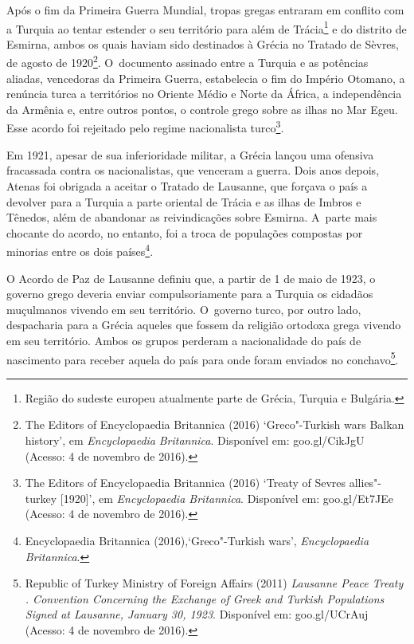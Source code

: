 Após o fim da Primeira Guerra Mundial, tropas gregas entraram em
conflito com a Turquia ao tentar estender o seu território para além
de Trácia\footnote{ Região do sudeste europeu atualmente parte de
Grécia, Turquia e Bulgária.}  e do distrito de Esmirna, ambos os quais
haviam sido destinados à Grécia no Tratado de Sèvres, de agosto de
1920\footnote{ The Editors of Encyclopaedia Britannica (2016)
`Greco"-Turkish wars \textbar{} Balkan history', em \emph{Encyclopaedia}
\emph{Britannica}. Disponível em:
goo.gl/CikJgU
(Acesso: 4 de
novembro de 2016).}. O~documento assinado entre a Turquia e as potências
aliadas, vencedoras da Primeira Guerra, estabelecia o fim do
Império Otomano, a renúncia turca a territórios no Oriente Médio e Norte
da África, a independência da Armênia e, entre outros pontos, o controle
grego sobre as ilhas no Mar Egeu. Esse acordo foi rejeitado pelo regime
nacionalista turco\footnote{ The Editors of Encyclopaedia Britannica (2016)
`Treaty of Sevres \textbar{} allies"-turkey {[}1920{]}', em
\emph{Encyclopaedia Britannica}. Disponível em:
goo.gl/Et7JEe
(Acesso: 4 de novembro
de 2016).}.

Em 1921, apesar de sua inferioridade militar, a Grécia lançou uma
ofensiva fracassada contra os nacionalistas, que venceram a guerra. Dois
anos depois, Atenas foi obrigada a aceitar o Tratado de Lausanne, que
forçava o país a devolver para a Turquia a parte oriental de Trácia e as
ilhas de Imbros e Tênedos, além de abandonar as reivindicações sobre
Esmirna. A~parte mais chocante do acordo, no entanto, foi a troca de
populações compostas por minorias entre os dois
países\footnote{ Encyclopaedia Britannica (2016),`Greco"-Turkish
wars', \emph{Encyclopaedia} \emph{Britannica}.}.

O Acordo de Paz de Lausanne definiu que, a partir de 1 de maio de 1923,
o governo grego deveria enviar compulsoriamente para a Turquia os
cidadãos muçulmanos vivendo em seu território. O~governo turco, por
outro lado, despacharia para a Grécia aqueles que fossem da religião
ortodoxa grega vivendo em seu território. Ambos os grupos perderam a
nacionalidade do país de nascimento para receber aquela do país para
onde foram enviados no conchavo\footnote{ Republic of Turkey Ministry of Foreign Affairs
(2011) \emph{Lausanne Peace Treaty . Convention Concerning the
Exchange of Greek and Turkish Populations Signed at Lausanne, January
30, 1923}. Disponível em:
goo.gl/UCrAuj
(Acesso: 4 de novembro de 2016).}.


